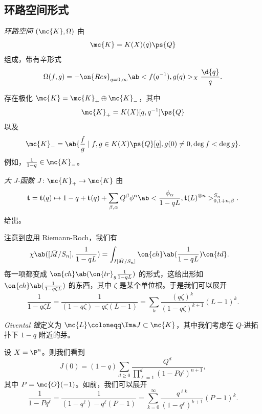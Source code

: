 \subsection{环路空间形式}%
\label{sub:Loop space formalism}

\begin{defn}
    \textit{环路空间} \((\mc{K}, \Omega)\) 由
    \[ \mc{K} = K(X)(q) \ps{Q}\]
    组成，带有辛形式
    \[ \Omega(f, g) = - \on{Res}_{q = 0, \infty} \ab<f(q^{-1}), g(q)>_X \frac{\d{q}}{q}. \]
\end{defn}

\begin{rmk}
    存在极化 \(\mc{K} = \mc{K}_+ \oplus \mc{K}_-\)，其中
    \[ \mc{K}_+ = K(X)[q, q^{-1}]\ps{Q} \]
    以及
    \[ \mc{K}_- = \ab\{ \frac{f}{g} \mid f, g \in K(X)\ps{Q}[q], g(0) \neq 0, \deg f < \deg g\}. \]
    例如，\(\frac{1}{1-q} \in \mc{K}_-\)。
\end{rmk}

\begin{defn}
    \textit{大 J-函数} \(J \colon \mc{K}_+ \to \mc{K}\) 由
    \[ \mathbf{t} = \mathbf{t}(q) \mapsto 1 - q + \mathbf{t}(q) + \sum_{\beta, \alpha} Q^{\beta} \phi^{\alpha} \ab< \frac{\phi_{\alpha}}{1-qL}, \mathbf{t}(L)^{\otimes n}>_{0, 1+n, \beta}^{S_n}. \]
    给出。
\end{defn}

\begin{rmk}
    注意到应用 Riemann-Roch，我们有
    \begin{align*}
        \chi\ab([\bar{M}/S_n], \frac{1}{1-qL}) &= \int_{I[\bar{M}/S_n]} \on{ch}\ab(\frac{1}{1-qL}) \on{td}.
    \end{align*}
    每一项都变成 \(\on{ch}\ab(\on{tr}_g \frac{1}{1-qL})\) 的形式，这给出形如 \(\on{ch}\ab(\frac{1}{1-q\zeta L})\) 的东西，其中 \(\zeta\) 是某个单位根。于是我们可以展开
    \[ \frac{1}{1-q\zeta L} = \frac{1}{(1-q \zeta) - q\zeta (L-1)} = \sum_k \frac{(q\zeta)^k}{(1-q\zeta)^{k+1}}(L-1)^k. \]
\end{rmk}

\begin{defn}
    \textit{Givental 锥}定义为 \(\mc{L} \coloneqq \Ima J \subset \mc{K}\)，其中我们考虑在 \(Q\)-进拓扑下 \(1-q\) 附近的芽。
\end{defn}

\begin{exm}
    设 \(X = \P^n\)。则我们看到
    \[ J(0) = (1-q) \sum_{d \geq 0} \frac{Q^d}{\prod_{\ell=1}^d (1-Pq^{\ell})^{n+1}}, \]
    其中 \(P = \mc{O}(-1)\)。如前，我们可以展开
    \[ \frac{1}{1-P q^{\ell}} = \frac{1}{(1-q^{\ell}) - q^{\ell}(P-1)} = \sum_{k=0}^{\infty} \frac{q^{\ell k}}{(1-q^{\ell})^{k+1}}(P-1)^k. \]
\end{exm}

